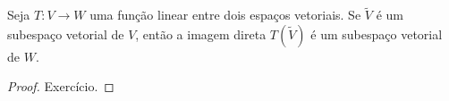\begin{theorem}
	Seja $T\colon V\to W$ uma função linear entre dois espaços vetoriais. Se $\widetilde{V}$ é um subespaço vetorial de $V$, então a imagem direta $T(\widetilde{V})$ é um subespaço vetorial de $W$.
\end{theorem}

\begin{proof}
	Exercício.
\end{proof}